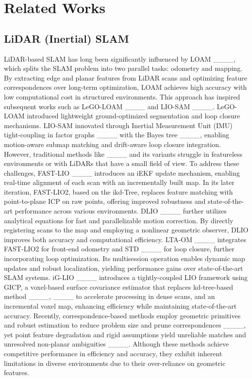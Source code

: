 \section{Related Works}
\vspace{-0.5mm}
\subsection{LiDAR (Inertial) SLAM}
\vspace{-1mm}

LiDAR-based SLAM has long been significantly influenced by LOAM ____, which splits the SLAM problem into two parallel tasks: odometry and mapping. By extracting edge and planar features from LiDAR scans and optimizing feature correspondences over long-term optimization, LOAM achieves high accuracy with low computational cost in structured environments. This approach has inspired subsequent works such as LeGO-LOAM ____ and LIO-SAM ____. LeGO-LOAM introduced lightweight ground-optimized segmentation and loop closure mechanisms. LIO-SAM innovated through Inertial Measurement Unit (IMU) tight-coupling in factor graphs ____ with the Bayes tree ____, enabling motion-aware submap matching and drift-aware loop closure integration. However, traditional methods like ____ and its variants struggle in featureless environments or with LiDARs that have a small field of view. To address these challenges, FAST-LIO ____ introduces an iEKF update mechanism, enabling real-time alignment of each scan with an incrementally built map. In its later iteration, FAST-LIO2, based on the ikd-Tree, replaces feature matching with point-to-plane ICP on raw points, offering improved robustness and state-of-the-art performance across various environments. DLIO ____ further utilizes analytical equations for fast and parallelizable motion correction. By directly registering scans to the map and employing a nonlinear geometric observer, DLIO improves both accuracy and computational efficiency. LTA-OM ____ integrates FAST-LIO2 for front-end odometry and STD ____ for loop closure, further incorporating loop optimization. Its multisession operation enables dynamic map updates and robust localization, yielding performance gains over state-of-the-art SLAM systems. iG-LIO ____ introduces a tightly-coupled LIO framework using GICP, a voxel-based surface covariance estimator that replaces kd-tree-based method ____, ____ to accelerate processing in dense scans, and an incremental voxel map, enhancing efficiency while maintaining state-of-the-art accuracy. Recently, correspondence-based methods employ geometric primitives and robust estimation to reduce problem size and prune correspondences ____, yet point feature degradation and rigid assumptions yield unreliable matches and unresolved non‑planar ambiguities ____. Although these methods achieve competitive performance in efficiency and accuracy, they exhibit inherent limitations in diverse environments due to their over-reliance on geometric features.
